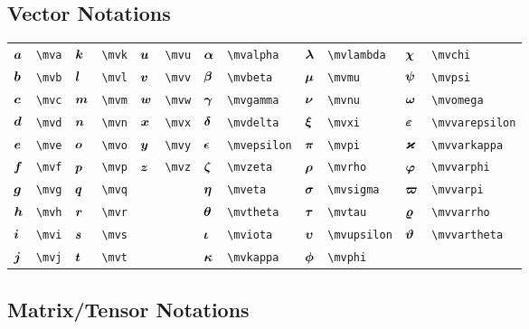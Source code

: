 \documentclass{article}
\begin{document}
\subsection{Vector Notations}
\begin{tabular}{*{12}{l}}
${\bm a}$ & \lstinline`\mva` & ${\bm k}$ & \lstinline`\mvk` & ${\bm u}$ & \lstinline`\mvu` & ${\bm \alpha}$ & \lstinline`\mvalpha` & ${\bm \lambda}$ & \lstinline`\mvlambda` & ${\bm \chi}$ & \lstinline`\mvchi`\\
${\bm b}$ & \lstinline`\mvb` & ${\bm l}$ & \lstinline`\mvl` & ${\bm v}$ & \lstinline`\mvv` & ${\bm \beta}$ & \lstinline`\mvbeta` & ${\bm \mu}$ & \lstinline`\mvmu` & ${\bm \psi}$ & \lstinline`\mvpsi`\\
${\bm c}$ & \lstinline`\mvc` & ${\bm m}$ & \lstinline`\mvm` & ${\bm w}$ & \lstinline`\mvw` & ${\bm \gamma}$ & \lstinline`\mvgamma` & ${\bm \nu}$ & \lstinline`\mvnu` & ${\bm \omega}$ & \lstinline`\mvomega`\\
${\bm d}$ & \lstinline`\mvd` & ${\bm n}$ & \lstinline`\mvn` & ${\bm x}$ & \lstinline`\mvx` & ${\bm \delta}$ & \lstinline`\mvdelta` & ${\bm \xi}$ & \lstinline`\mvxi` & ${\bm \varepsilon}$ & \lstinline`\mvvarepsilon`\\
${\bm e}$ & \lstinline`\mve` & ${\bm o}$ & \lstinline`\mvo` & ${\bm y}$ & \lstinline`\mvy` & ${\bm \epsilon}$ & \lstinline`\mvepsilon` & ${\bm \pi}$ & \lstinline`\mvpi` & ${\bm \varkappa}$ & \lstinline`\mvvarkappa`\\
${\bm f}$ & \lstinline`\mvf` & ${\bm p}$ & \lstinline`\mvp` & ${\bm z}$ & \lstinline`\mvz` & ${\bm \zeta}$ & \lstinline`\mvzeta` & ${\bm \rho}$ & \lstinline`\mvrho` & ${\bm \varphi}$ & \lstinline`\mvvarphi`\\
${\bm g}$ & \lstinline`\mvg` & ${\bm q}$ & \lstinline`\mvq` &  &  & ${\bm \eta}$ & \lstinline`\mveta` & ${\bm \sigma}$ & \lstinline`\mvsigma` & ${\bm \varpi}$ & \lstinline`\mvvarpi`\\
${\bm h}$ & \lstinline`\mvh` & ${\bm r}$ & \lstinline`\mvr` &  &  & ${\bm \theta}$ & \lstinline`\mvtheta` & ${\bm \tau}$ & \lstinline`\mvtau` & ${\bm \varrho}$ & \lstinline`\mvvarrho`\\
${\bm i}$ & \lstinline`\mvi` & ${\bm s}$ & \lstinline`\mvs` &  &  & ${\bm \iota}$ & \lstinline`\mviota` & ${\bm \upsilon}$ & \lstinline`\mvupsilon` & ${\bm \vartheta}$ & \lstinline`\mvvartheta`\\
${\bm j}$ & \lstinline`\mvj` & ${\bm t}$ & \lstinline`\mvt` &  &  & ${\bm \kappa}$ & \lstinline`\mvkappa` & ${\bm \phi}$ & \lstinline`\mvphi` & \\
\end{tabular}

\subsection{Matrix/Tensor Notations}
\end{document}
